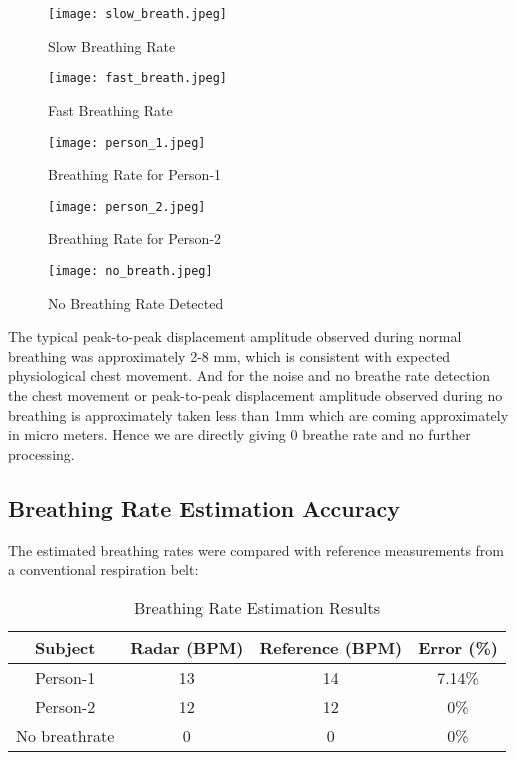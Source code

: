 \documentclass[12pt]{article}
\begin{document}
\begin{figure}[H]
\centering
\texttt{[image: slow\_breath.jpeg]} %
\caption{Slow Breathing Rate}
\end{figure}

\begin{figure}[H]
\centering
\texttt{[image: fast\_breath.jpeg]} %
\caption{Fast Breathing Rate}
\end{figure}

\begin{figure}[H]
\centering
\texttt{[image: person\_1.jpeg]} %
\caption{Breathing Rate for Person-1}
\end{figure}


\begin{figure}[H]
\centering
\texttt{[image: person\_2.jpeg]} %
\caption{Breathing Rate for Person-2}
\end{figure}

\begin{figure}[H]
\centering
\texttt{[image: no\_breath.jpeg]} %
\caption{No Breathing Rate Detected}
\end{figure}

The typical peak-to-peak displacement amplitude observed during normal breathing was approximately 2-8 mm, which is consistent with expected physiological chest movement. And for the noise and no breathe rate detection the chest movement or peak-to-peak displacement amplitude observed during no breathing is approximately taken less than 1mm which are coming approximately in micro meters. Hence we are directly giving 0 breathe rate and no further processing.

\subsection{Breathing Rate Estimation Accuracy}
The estimated breathing rates were compared with reference measurements from a conventional respiration belt:

\begin{table}[H]
\centering
\begin{tabular}{|c|c|c|c|}
\hline
\textbf{Subject} & \textbf{Radar (BPM)} & \textbf{Reference (BPM)} & \textbf{Error (\%)} \\
\hline
Person-1 & 13 & 14 & 7.14\% \\
Person-2 & 12 & 12 & 0\% \\
No breathrate & 0 & 0 & 0\% \\
\hline
\end{tabular}
\caption{Breathing Rate Estimation Results}
\end{table}
\end{document}
